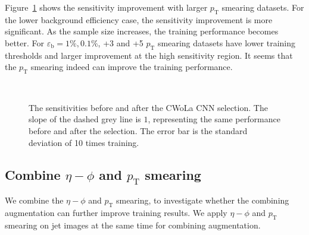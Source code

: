 \documentclass[12pt]{article}
\begin{document}
		Figure~\ref{fig:sensitivity_improvement_origin_pt_aug_1_3_5} shows the sensitivity improvement with larger $p_{\text{T}}$ smearing datasets. For the lower background efficiency case, the sensitivity improvement is more significant. As the sample size increases, the training performance becomes better. For $\varepsilon_{\text{b}} = 1 \%, 0.1 \%$, +3 and +5 $p_{\text{T}}$ smearing datasets have lower training thresholds and larger improvement at the high sensitivity region. It seems that the $p_{\text{T}}$ smearing indeed can improve the training performance.
		\begin{figure}[htpb]
			\centering
			 \\
			\caption{The sensitivities before and after the CWoLa CNN selection. The slope of the dashed grey line is $1$, representing the same performance before and after the selection. The error bar is the standard deviation of 10 times training.}
			\label{fig:sensitivity_improvement_origin_pt_aug_1_3_5}
		\end{figure}
	\subsection{Combine \texorpdfstring{$\eta-\phi$}{eta-phi} and \texorpdfstring{$p_{\mathrm{T}}$}{pT} smearing}%
	\label{sub:combine_eta_phi_and_pt_smearing}
		We combine the $\eta-\phi$ and $p_{\text{T}}$ smearing, to investigate whether the combining augmentation can further improve training results. We apply $\eta-\phi$ and $p_{\text{T}}$ smearing on jet images at the same time for combining augmentation.
\end{document}
